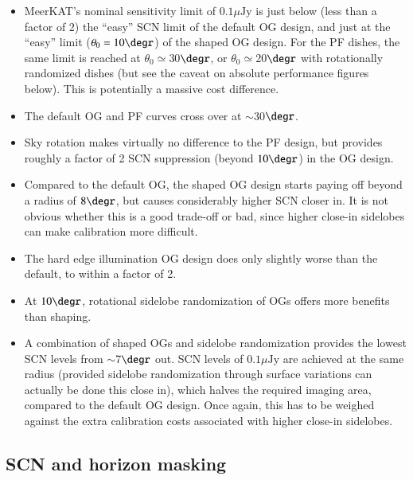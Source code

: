 \documentclass{aa}
\begin{document}
\begin{itemize}
  \item MeerKAT's nominal sensitivity limit of $0.1 \mu\mathrm{Jy}$ is just below (less than a factor of 2) the ``easy'' SCN limit of the default OG design, and just at the ``easy'' limit ($\theta_0=10\degr$) of the shaped OG design. For the PF dishes,  the same limit is reached at $\theta_0\simeq$30$\degr$, or $\theta_0\simeq$20$\degr$ with rotationally randomized dishes (but see the caveat on absolute performance figures below). This is potentially a massive cost difference.
  \item The default OG and PF curves cross over at $\sim$30$\degr$.
  \item Sky rotation makes virtually no difference to the PF design, but provides roughly a factor of 2 SCN suppression (beyond $10\degr$) in the OG design.
  \item Compared to the default OG, the shaped OG design starts paying off beyond a radius of $8\degr$, but causes considerably higher SCN closer in. It is not obvious whether this is a good trade-off or bad, since higher close-in sidelobes can make calibration more difficult.
  \item The hard edge illumination OG design does only slightly worse than the default, to within a factor of 2.
  \item At $10\degr$, rotational sidelobe randomization of OGs offers more benefits than shaping.
  \item A combination of shaped OGs and sidelobe randomization provides the lowest SCN levels from $\sim$7$\degr$ out.
  SCN levels of $0.1 \mu\mathrm{Jy}$ are achieved at the same radius (provided sidelobe randomization through surface variations can actually be done this close in), which halves the required imaging area, compared to the default OG design. Once again, this has to be weighed against the extra calibration costs associated with higher close-in sidelobes.
\end{itemize}

\subsection{SCN and horizon masking}
\label{sec:results-horizon-masking}
\end{document}
